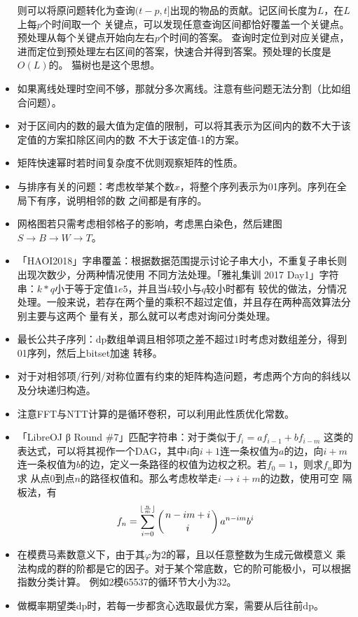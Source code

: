 \begin{itemize}
	则可以将原问题转化为查询$(t-p,t]$出现的物品的贡献。记区间长度为$L$，在$L$上每$p$个时间取一个
	关键点，可以发现任意查询区间都恰好覆盖一个关键点。预处理从每个关键点开始向左右$p$个时间的答案。
	查询时定位到对应关键点，进而定位到预处理左右区间的答案，快速合并得到答案。预处理的长度是$O(L)$的。
	猫树也是这个思想。
	\item 如果离线处理时空间不够，那就分多次离线。注意有些问题无法分割（比如组合问题）。
	\item 对于区间内的数的最大值为定值的限制，可以将其表示为区间内的数不大于该定值的方案扣除区间内的数
	不大于该定值-1的方案。
	\item 矩阵快速幂时若时间复杂度不优则观察矩阵的性质。
	\item 与排序有关的问题：考虑枚举某个数$x$，将整个序列表示为01序列。序列在全局下有序，说明相邻的数
	之间都是有序的。
	\item 网格图若只需考虑相邻格子的影响，考虑黑白染色，然后建图
	$S\rightarrow B\rightarrow W\rightarrow T$。
	\item 「HAOI2018」字串覆盖：根据数据范围提示讨论子串大小，不重复子串长则出现次数少，分两种情况使用
	不同方法处理。「雅礼集训 2017 Day1」字符串：$k*q$小于等于定值$1e5$，并且当$k$较小与$q$较小时都有
	较优的做法，分情况处理。一般来说，若存在两个量的乘积不超过定值，并且存在两种高效算法分别主要与这两个
	量有关，那么就可以考虑对询问分类处理。
	\item 最长公共子序列：dp数组单调且相邻项之差不超过1时考虑对数组差分，得到01序列，然后上bitset加速
	转移。
	\item 对于对相邻项/行列/对称位置有约束的矩阵构造问题，考虑两个方向的斜线以及分块递归构造。
	\item 注意FFT与NTT计算的是循环卷积，可以利用此性质优化常数。
	\item 「LibreOJ β Round \#7」匹配字符串：对于类似于$f_i=af_{i-1}+bf_{i-m}$
	这类的表达式，可以将其视作一个DAG，其中$i$向$i+1$连一条权值为$a$的边，向$i+m$
	连一条权值为$b$的边，定义一条路径的权值为边权之积。若$f_0=1$，则求$f_n$即为求
	从点0到点$n$的路径权值和。那么考虑枚举走$i\rightarrow i+m$的边数，使用可空
	隔板法，有
	\begin{displaymath}
		f_n=\sum_{i=0}^{\lfloor\frac{n}{m}\rfloor}{\left(n-im+i \atop i\right)a^{n-im}b^i}
	\end{displaymath}
	\item 在模费马素数意义下，由于其$\varphi$为2的幂，且以任意整数为生成元做模意义
	乘法构成的群的阶都是它的因子。对于某个常底数，它的阶可能极小，可以根据指数分类计算。
	例如2模65537的循环节大小为32。
	\item 做概率期望类dp时，若每一步都贪心选取最优方案，需要从后往前dp。

\end{itemize}
